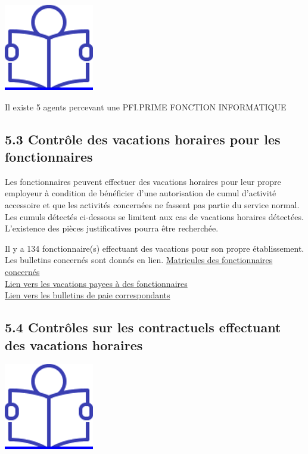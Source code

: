 \href{../Docs/Notices/fiche_PFI.odt}{\includegraphics{icones/Notice.png}}

Il existe 5 agents percevant une PFI.PRIME FONCTION INFORMATIQUE

\hypertarget{controle-des-vacations-horaires-pour-les-fonctionnaires}{%
\subsection{5.3 Contrôle des vacations horaires pour les
fonctionnaires}\label{controle-des-vacations-horaires-pour-les-fonctionnaires}}

Les fonctionnaires peuvent effectuer des vacations horaires pour leur
propre employeur à condition de bénéficier d'une autorisation de cumul
d'activité accessoire et que les activités concernées ne fassent pas
partie du service normal. Les cumuls détectés ci-dessous se limitent aux
cas de vacations horaires détectées. L'existence des pièces
justificatives pourra être recherchée.

Il y a 134 fonctionnaire(s) effectuant des vacations pour son propre
établissement. Les bulletins concernés sont donnés en lien.
\href{../Bases/Reglementation/matricules.fonctionnaires.et.vacations.csv}{Matricules
des fonctionnaires concernés}\\
\href{../Bases/Reglementation/lignes.fonctionnaires.et.vacations.csv}{Lien
vers les vacations payees à des fonctionnaires}\\
\href{../Bases/Reglementation/Paie_vac_fonct.csv}{Lien vers les bulletins
de paie correspondants}

\hypertarget{controles-sur-les-contractuels-effectuant-des-vacations-horaires}{%
\subsection{5.4 Contrôles sur les contractuels effectuant des vacations
horaires}\label{controles-sur-les-contractuels-effectuant-des-vacations-horaires}}

\href{../Docs/Notices/fiche_CEV_droit.odt}{\includegraphics{icones/Notice.png}}

